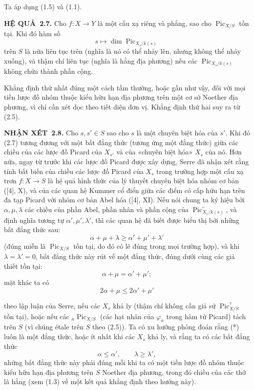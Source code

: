\documentclass[11pt,twoside,openany]{book}
\numberwithin{equation}{section}
\newcommand{\src}[1]{%
  \phantomsection\hypertarget{src:\fgasourceid:#1}{}%
  \marginpar{\raggedleft\footnotesize\sffamily #1}%
}
\newcommand{\fgasourceid}{unset}
\newcommand{\result}[2]{\par\medskip\noindent\textbf{#1\if\relax\detokenize{#2}\relax\else\ #2\fi.}\quad}
\begin{document}
Ta áp dụng (1.5) và (1.1).
\src{234}
\result{HỆ QUẢ}{2.7} Cho $f:X\longrightarrow Y$ là một cấu xạ riêng và phẳng, sao cho $\operatorname{Pic}_{X/S}$ tồn
tại. Khi đó hàm số
\[
s\longmapsto\dim\operatorname{Pic}_{X_s/k(s)}
\]
trên $S$ là nửa liên tục trên (nghĩa là nó có thể nhảy lên, nhưng không thể
nhảy xuống), và thậm chí liên tục (nghĩa là hằng địa phương) nếu các
$\operatorname{Pic}_{X_s/k(s)}$ không chứa thành phần cộng.

Khẳng định thứ nhất đúng một cách tầm thường, hoặc gần như vậy, đối với mọi
tiền lược đồ nhóm thuộc kiểu hữu hạn địa phương trên một cơ sở Noether địa
phương, vì chỉ cần xét dọc theo tiết diện đơn vị. Khẳng định thứ hai suy ra từ
(2.5).

\result{NHẬN XÉT}{2.8} Cho $s,s'\in S$ sao cho $s$ là một chuyên biệt hóa của
$s'$. Khi đó (2.7) tương đương với một bất đẳng thức (tương ứng một đẳng thức)
giữa các chiều của các lược đồ Picard của $X_{s'}$ và của «chuyên biệt hóa»
$X_s$ của nó. Hơn nữa, ngay từ trước khi các lược đồ Picard được xây dựng,
Serre đã nhận xét rằng tính bất biến của chiều các lược đồ Picard của $X_s$ trong
trường hợp một cấu xạ trơn $f:X\longrightarrow S$ là hệ quả hình thức của lý
thuyết chuyên biệt hóa nhóm cơ bản ([4], X), và của các quan hệ Kummer cổ điển
giữa các điểm có cấp hữu hạn trên đa tạp Picard với nhóm cơ bản Abel hóa ([4],
XI). Nếu nói chung ta ký hiệu bởi $\alpha,\mu,\lambda$ các chiều của phần Abel,
phần nhân và phần cộng của $\operatorname{Pic}_{X_s/k(s)}^\circ$, và định
nghĩa tương tự $\alpha',\mu',\lambda'$, thì các quan hệ đã biết được biểu thị
bởi những bất đẳng thức sau:
\[
\tag{*}\alpha+\mu+\lambda\geq\alpha'+\mu'+\lambda'
\]
(đúng miễn là $\operatorname{Pic}_{X/S}$ tồn tại, do đó có lẽ đúng trong mọi
trường hợp), và khi $\lambda=\lambda'=0$, bất đẳng thức này rút về một đẳng
thức, đúng dưới cùng các giả thiết tồn tại:
\[
\alpha+\mu=\alpha'+\mu' ;
\]
mặt khác ta có
\[
\tag{**}2\alpha+\mu\leq2\alpha'+\mu'
\]
\src{235}
theo lập luận của Serre, nếu các $X_s$ khả ly (thậm chí không cần giả sử
$\operatorname{Pic}_{X/S}^\tau$ tồn tại), hoặc nếu các
${}_n\operatorname{Pic}_{X/S}$ (các hạt nhân của $\varphi_n$ trong hàm tử
Picard) tách trên $S$ (vì chúng étale trên $S$ theo (2.5)). Ta có xu hướng
phỏng đoán rằng (*) luôn là một đẳng thức, hoặc ít nhất khi các $X_s$ khả ly,
và rằng ta có các bất đẳng thức
\[
\tag{***}\alpha\leq\alpha',\qquad\lambda\geq\lambda',
\]
những bất đẳng thức này phải đúng mỗi khi ta có một tiền lược đồ nhóm thuộc
kiểu hữu hạn địa phương trên $S$ Noether địa phương, trong đó chiều của các
thớ là hằng (xem (1.3) về một kết quả khẳng định theo hướng này).
\end{document}
